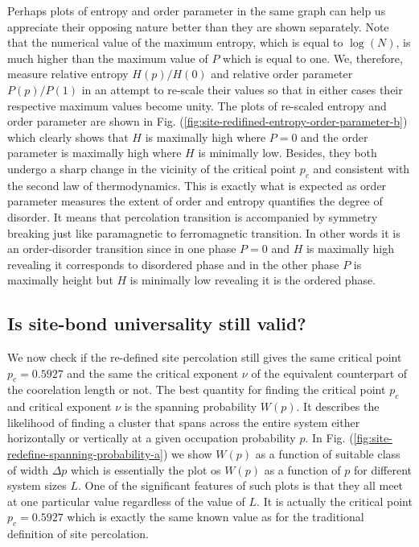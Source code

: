 	
	
	Perhaps plots of entropy and order parameter
	in the same graph can help us appreciate their opposing nature better than they are shown separately. 
	Note that the numerical value of the maximum 
	entropy, which is equal to $\log (N)$, is much higher than the maximum value of $P$ which is equal to one. 
	We, therefore, measure relative entropy $H(p)/H(0)$ and relative order parameter $P(p)/P(1)$ 
	in an attempt to re-scale their values so that in either cases their respective maximum values become
	unity. The plots of re-scaled entropy and order parameter
	are shown in Fig. (\ref{fig:site-redifined-entropy-order-parameter-b}) which clearly shows that $H$ is maximally high where $P=0$ and the order parameter is maximally high 
	where $H$ is minimally low. Besides, they both undergo a sharp change in the vicinity of the critical point $p_c$ and consistent with the second law of thermodynamics. This is exactly what is expected as order
	parameter measures the extent of order and entropy quantifies the degree of disorder. 
	It means that percolation transition 
	is accompanied by symmetry breaking just like paramagnetic to ferromagnetic
	transition. In other words 
	it is an order-disorder transition since in one phase $P=0$ and $H$ is maximally high revealing
	it corresponds to disordered phase and in the other phase $P$ is maximally height but $H$ is minimally low revealing
	it is the ordered phase.
	
	
	
	

	
	
	
	\subsection{Is site-bond universality still valid?}
	
	
	We now check if the re-defined site percolation still gives the
	same critical point $p_c=0.5927$ and the same the critical exponent $\nu$ of the equivalent
	counterpart of the coorelation length or not.
	The best quantity for finding the critical point $p_c$ and critical exponent $\nu$ is the
	spanning probability $W(p)$. It describes the likelihood of finding a 
	cluster that spans across the entire system
	either horizontally or vertically at a given occupation probability $p$.
	In Fig. (\ref{fig:site-redefine-spanning-probability-a}) we show $W(p)$ as a function of suitable class of width $\Delta p$
	which is essentially the plot os $W(p)$ as a function of
	$p$ for different system sizes $L$. One of the significant features of such plots is that they all 
	meet at one particular value regardless of the value of $L$. It 
	is actually the critical point $p_c=0.5927$
	which is exactly the same known value as for the traditional definition of site percolation. 
	
